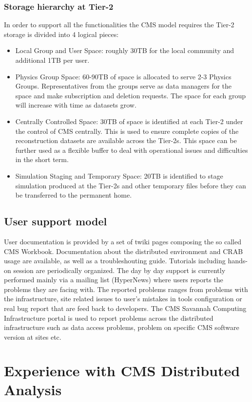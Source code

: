 \subsubsection{Storage hierarchy at Tier-2}
In order to support all the functionalities the CMS model requires the Tier-2 storage is divided into 4 logical pieces:
\begin{itemize}
\item{} Local Group and User Space: roughly 30TB for the local community and additional 1TB per user.
\item{} Physics Group Space: 60-90TB of space is allocated to serve 2-3 Physics Groups. Representatives from the groups serve as data managers for the space and make subscription and deletion requests.
The space for each group will increase with time as datasets grow.
\item{} Centrally Controlled Space: 30TB of space is identified at each Tier-2 under the control of CMS centrally.
This is used to ensure complete copies of the reconstruction datasets are available across the Tier-2s. This space can be further used as a flexible buffer to deal with operational issues and difficulties in the short term.
\item{} Simulation Staging and Temporary Space: 20TB is identified to
stage simulation produced at the Tier-2s and other temporary
files before they can be transferred to the permanent home. 
\end{itemize}

\subsection{User support model}
\label{sec:4_4}
User documentation is provided by a set of twiki pages composing the so called CMS Workbook. Documentation about the distributed environment and CRAB usage are available, as well as a troubleshouting guide.
Tutorials including hands-on session are periodically organized.
The day by day support is currently performed mainly via a mailing list (HyperNews) where users reports the problems they are facing with. The reported problems ranges
 from problems with the infrastructure, site related issues to user's mistakes in tools configuration or real bug report that are feed back to developers.
The CMS Savannah Computing Infrastructure portal is used to report problems across the distributed infrastructure such as data access problems, problem on specific CMS software version at sites etc.

\section{Experience with CMS Distributed Analysis}
\label{sec:5}

